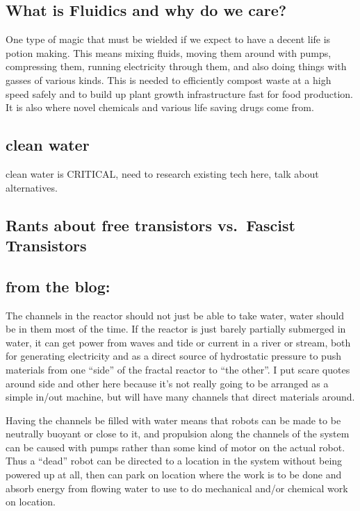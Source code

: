 \subsection{What is Fluidics and why do we
care?}\label{what-is-fluidics-and-why-do-we-care}

One type of magic that must be wielded if we expect to have a decent
life is potion making. This means mixing fluids, moving them around with
pumps, compressing them, running electricity through them, and also
doing things with gasses of various kinds. This is needed to efficiently
compost waste at a high speed safely and to build up plant growth
infrastructure fast for food production. It is also where novel
chemicals and various life saving drugs come from.

\subsection{clean water}\label{clean-water}

clean water is CRITICAL, need to research existing tech here, talk about
alternatives.

\subsection{Rants about free transistors vs.~Fascist
Transistors}\label{rants-about-free-transistors-vs.fascist-transistors}

\subsection{from the blog:}\label{from-the-blog}

The channels in the reactor should not just be able to take water, water
should be in them most of the time. If the reactor is just barely
partially submerged in water, it can get power from waves and tide or
current in a river or stream, both for generating electricity and as a
direct source of hydrostatic pressure to push materials from one
``side'' of the fractal reactor to ``the other''. I put scare quotes
around side and other here because it's not really going to be arranged
as a simple in/out machine, but will have many channels that direct
materials around.

Having the channels be filled with water means that robots can be made
to be neutrally buoyant or close to it, and propulsion along the
channels of the system can be caused with pumps rather than some kind of
motor on the actual robot. Thus a ``dead'' robot can be directed to a
location in the system without being powered up at all, then can park on
location where the work is to be done and absorb energy from flowing
water to use to do mechanical and/or chemical work on location.

